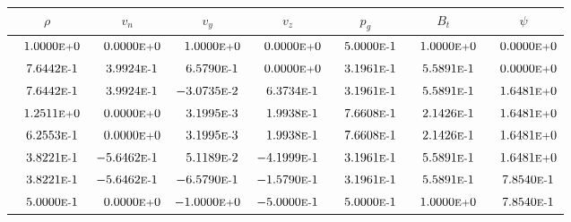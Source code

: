 \begin{tabular*}{\textwidth}{@{\extracolsep{\fill}} ccccccc}
\\ 
\hline 
\hline 
$\rho$ & $v_n$ & $v_y$ & $v_z$ & $p_g$ & $B_t$ & $\psi$ \\ 
\hline 
$\phantom{-} 1.0000\mbox{\sc{e}\smaller{+}}0$ & $\phantom{-} 0.0000\mbox{\sc{e}\smaller{+}}0$ & $\phantom{-} 1.0000\mbox{\sc{e}\smaller{+}}0$ & $\phantom{-} 0.0000\mbox{\sc{e}\smaller{+}}0$ & $\phantom{-} 5.0000\mbox{\sc{e}\smaller{-}}1$ & $\phantom{-} 1.0000\mbox{\sc{e}\smaller{+}}0$ & $\phantom{-} 0.0000\mbox{\sc{e}\smaller{+}}0$ \\ 
$\phantom{-} 7.6442\mbox{\sc{e}\smaller{-}}1$ & $\phantom{-} 3.9924\mbox{\sc{e}\smaller{-}}1$ & $\phantom{-} 6.5790\mbox{\sc{e}\smaller{-}}1$ & $\phantom{-} 0.0000\mbox{\sc{e}\smaller{+}}0$ & $\phantom{-} 3.1961\mbox{\sc{e}\smaller{-}}1$ & $\phantom{-} 5.5891\mbox{\sc{e}\smaller{-}}1$ & $\phantom{-} 0.0000\mbox{\sc{e}\smaller{+}}0$ \\ 
$\phantom{-} 7.6442\mbox{\sc{e}\smaller{-}}1$ & $\phantom{-} 3.9924\mbox{\sc{e}\smaller{-}}1$ & $-3.0735\mbox{\sc{e}\smaller{-}}2$ & $\phantom{-} 6.3734\mbox{\sc{e}\smaller{-}}1$ & $\phantom{-} 3.1961\mbox{\sc{e}\smaller{-}}1$ & $\phantom{-} 5.5891\mbox{\sc{e}\smaller{-}}1$ & $\phantom{-} 1.6481\mbox{\sc{e}\smaller{+}}0$ \\ 
$\phantom{-} 1.2511\mbox{\sc{e}\smaller{+}}0$ & $\phantom{-} 0.0000\mbox{\sc{e}\smaller{+}}0$ & $\phantom{-} 3.1995\mbox{\sc{e}\smaller{-}}3$ & $\phantom{-} 1.9938\mbox{\sc{e}\smaller{-}}1$ & $\phantom{-} 7.6608\mbox{\sc{e}\smaller{-}}1$ & $\phantom{-} 2.1426\mbox{\sc{e}\smaller{-}}1$ & $\phantom{-} 1.6481\mbox{\sc{e}\smaller{+}}0$ \\ 
$\phantom{-} 6.2553\mbox{\sc{e}\smaller{-}}1$ & $\phantom{-} 0.0000\mbox{\sc{e}\smaller{+}}0$ & $\phantom{-} 3.1995\mbox{\sc{e}\smaller{-}}3$ & $\phantom{-} 1.9938\mbox{\sc{e}\smaller{-}}1$ & $\phantom{-} 7.6608\mbox{\sc{e}\smaller{-}}1$ & $\phantom{-} 2.1426\mbox{\sc{e}\smaller{-}}1$ & $\phantom{-} 1.6481\mbox{\sc{e}\smaller{+}}0$ \\ 
$\phantom{-} 3.8221\mbox{\sc{e}\smaller{-}}1$ & $-5.6462\mbox{\sc{e}\smaller{-}}1$ & $\phantom{-} 5.1189\mbox{\sc{e}\smaller{-}}2$ & $-4.1999\mbox{\sc{e}\smaller{-}}1$ & $\phantom{-} 3.1961\mbox{\sc{e}\smaller{-}}1$ & $\phantom{-} 5.5891\mbox{\sc{e}\smaller{-}}1$ & $\phantom{-} 1.6481\mbox{\sc{e}\smaller{+}}0$ \\ 
$\phantom{-} 3.8221\mbox{\sc{e}\smaller{-}}1$ & $-5.6462\mbox{\sc{e}\smaller{-}}1$ & $-6.5790\mbox{\sc{e}\smaller{-}}1$ & $-1.5790\mbox{\sc{e}\smaller{-}}1$ & $\phantom{-} 3.1961\mbox{\sc{e}\smaller{-}}1$ & $\phantom{-} 5.5891\mbox{\sc{e}\smaller{-}}1$ & $\phantom{-} 7.8540\mbox{\sc{e}\smaller{-}}1$ \\ 
$\phantom{-} 5.0000\mbox{\sc{e}\smaller{-}}1$ & $\phantom{-} 0.0000\mbox{\sc{e}\smaller{+}}0$ & $-1.0000\mbox{\sc{e}\smaller{+}}0$ & $-5.0000\mbox{\sc{e}\smaller{-}}1$ & $\phantom{-} 5.0000\mbox{\sc{e}\smaller{-}}1$ & $\phantom{-} 1.0000\mbox{\sc{e}\smaller{+}}0$ & $\phantom{-} 7.8540\mbox{\sc{e}\smaller{-}}1$ \\ 
\hline 
\end{tabular*} 
